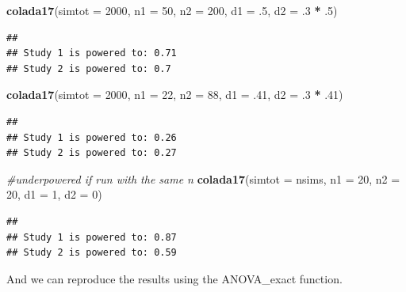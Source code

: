 \documentclass[]{book}
\newenvironment{Shaded}{\begin{snugshade}}{\end{snugshade}}
\newcommand{\CommentTok}[1]{\textcolor[rgb]{0.56,0.35,0.01}{\textit{#1}}}
\newcommand{\DataTypeTok}[1]{\textcolor[rgb]{0.13,0.29,0.53}{#1}}
\newcommand{\DecValTok}[1]{\textcolor[rgb]{0.00,0.00,0.81}{#1}}
\newcommand{\FloatTok}[1]{\textcolor[rgb]{0.00,0.00,0.81}{#1}}
\newcommand{\KeywordTok}[1]{\textcolor[rgb]{0.13,0.29,0.53}{\textbf{#1}}}
\newcommand{\NormalTok}[1]{#1}
\newcommand{\OperatorTok}[1]{\textcolor[rgb]{0.81,0.36,0.00}{\textbf{#1}}}
\newcommand{\StringTok}[1]{\textcolor[rgb]{0.31,0.60,0.02}{#1}}
\begin{document}
\begin{Shaded}
\begin{Highlighting}[]
  \KeywordTok{colada17}\NormalTok{(}\DataTypeTok{simtot =} \DecValTok{2000}\NormalTok{, }\DataTypeTok{n1 =} \DecValTok{50}\NormalTok{, }\DataTypeTok{n2 =} \DecValTok{200}\NormalTok{, }\DataTypeTok{d1 =} \FloatTok{.5}\NormalTok{, }\DataTypeTok{d2 =} \FloatTok{.3} \OperatorTok{*}\StringTok{ }\FloatTok{.5}\NormalTok{)}
\end{Highlighting}
\end{Shaded}

\begin{verbatim}
## 
## Study 1 is powered to: 0.71
## Study 2 is powered to: 0.7
\end{verbatim}

\begin{Shaded}
\begin{Highlighting}[]
  \KeywordTok{colada17}\NormalTok{(}\DataTypeTok{simtot =} \DecValTok{2000}\NormalTok{, }\DataTypeTok{n1 =} \DecValTok{22}\NormalTok{, }\DataTypeTok{n2 =} \DecValTok{88}\NormalTok{, }\DataTypeTok{d1 =} \FloatTok{.41}\NormalTok{, }\DataTypeTok{d2 =} \FloatTok{.3} \OperatorTok{*}\StringTok{ }\FloatTok{.41}\NormalTok{)}
\end{Highlighting}
\end{Shaded}

\begin{verbatim}
## 
## Study 1 is powered to: 0.26
## Study 2 is powered to: 0.27
\end{verbatim}

\begin{Shaded}
\begin{Highlighting}[]
\CommentTok{#underpowered if run with the same n}
\KeywordTok{colada17}\NormalTok{(}\DataTypeTok{simtot =}\NormalTok{ nsims, }\DataTypeTok{n1 =} \DecValTok{20}\NormalTok{, }\DataTypeTok{n2 =} \DecValTok{20}\NormalTok{, }\DataTypeTok{d1 =} \DecValTok{1}\NormalTok{, }\DataTypeTok{d2 =} \DecValTok{0}\NormalTok{)  }
\end{Highlighting}
\end{Shaded}

\begin{verbatim}
## 
## Study 1 is powered to: 0.87
## Study 2 is powered to: 0.59
\end{verbatim}

And we can reproduce the results using the ANOVA\_exact function.
\end{document}
